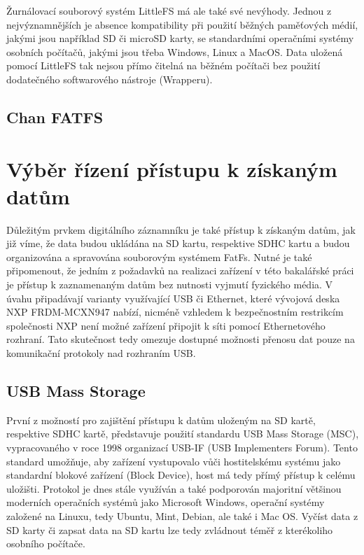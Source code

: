 Žurnálovací souborový systém LittleFS má ale také své nevýhody. Jednou z nejvýznamnějších je absence kompatibility při použití běžných paměťových médií, jakými jsou například SD či microSD karty, se standardními operačními systémy osobních počítačů, jakými jsou třeba Windows, Linux a MacOS. Data uložená pomocí LittleFS tak nejsou přímo čitelná na běžném počítači bez použití dodatečného softwarového nástroje (Wrapperu). \cite{cnx_software_little_fs}

\subsection{Chan FATFS}




\section{Výběr řízení přístupu k získaným datům}
Důležitým prvkem digitálního záznamníku je také přístup k získaným datům, jak již víme, že data budou ukládána na SD kartu, respektive SDHC kartu a budou organizována a spravována souborovým systémem FatFs. Nutné je také připomenout, že jedním z požadavků na realizaci zařízení v této bakalářské práci je přístup k zaznamenaným datům bez nutnosti vyjmutí fyzického média. V úvahu připadávají varianty využívající USB či Ethernet, které vývojová deska NXP FRDM-MCXN947 nabízí, nicméně vzhledem k bezpečnostním restrikcím společnosti NXP není možné zařízení připojit k síti pomocí Ethernetového rozhraní. Tato skutečnost tedy omezuje dostupné možnosti přenosu dat pouze na komunikační protokoly nad rozhraním USB. 


\subsection{USB Mass Storage}
První z možností pro zajištění přístupu k datům uloženým na SD kartě, respektive SDHC kartě, představuje použití standardu USB Mass Storage (MSC), vypracovaného v roce 1998 organizací USB-IF (USB Implementers Forum). Tento standard umožňuje, aby zařízení vystupovalo vůči hostitelskému systému jako standardní blokové zařízení (Block Device), host má tedy přímý přístup k celému uložišti. Protokol je dnes stále využíván a také podporován majoritní většinou moderních operačních systémů jako Microsoft Windows, operační systémy založené na Linuxu, tedy Ubuntu, Mint, Debian, ale také i Mac OS. Vyčíst data z SD karty či zapsat data na SD kartu lze tedy zvládnout téměř z kterékoliho osobního počítače.

